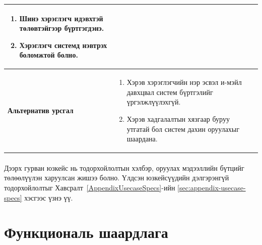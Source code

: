 \begin{table}[H]
\begin{tabular}{|p{3.8cm}|p{10.2cm}|}
\begin{enumerate}
            \item Шинэ хэрэглэгч идэвхтэй төлөвтэйгээр бүртгэгдэнэ.
            \item Хэрэглэгч системд нэвтрэх боломжтой болно.
        \end{enumerate}
        \\ \hline
        \textbf{Альтернатив урсгал} &
        \begin{enumerate}
            \item Хэрэв хэрэглэгчийн нэр эсвэл и-мэйл давхцвал систем бүртгэлийг үргэлжлүүлэхгүй.
            \item Хэрэв хадгалалтын хязгаар буруу утгатай бол систем дахин оруулахыг шаардана.
        \end{enumerate}
        \\ \hline
    \end{tabular}
\end{table}

\paragraph{}
Дээрх гурван юзкейс нь тодорхойлолтын хэлбэр, оруулах мэдээллийн бүтцийг төлөөлүүлэн харуулсан жишээ болно. Үлдсэн юзкейсүүдийн дэлгэрэнгүй тодорхойлолтыг Хавсралт~\ref{AppendixUsecaseSpecs}-ийн \ref{sec:appendix-usecase-specs} хэсгээс үзнэ үү.

\section{Функциональ шаардлага}

